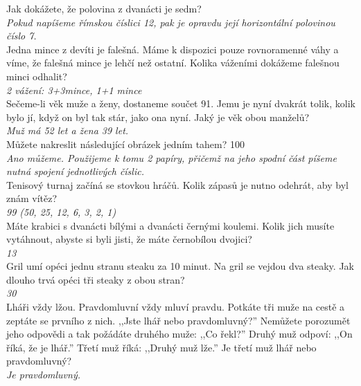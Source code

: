\begin{multicols}{2}
\noindent
Jak dokážete, že polovina z dvanácti je sedm?\\[1 mm]
{\sl Pokud napíšeme římskou číslici 12, pak je opravdu její horizontální 
polovinou číslo 7.}\\

\noindent
Jedna mince z devíti je falešná. Máme k dispozici pouze rovnoramenné 
váhy a víme, že falešná mince je lehčí než ostatní. Kolika váženími 
dokážeme falešnou minci odhalit?\\[1 mm]
{\sl 2 vážení: 3+3mince, 1+1 mince}\\

\noindent
Sečeme-li věk muže a ženy, dostaneme součet 91. Jemu je nyní 
dvakrát tolik, kolik bylo jí, když on byl tak stár, jako ona 
nyní. Jaký je věk obou manželů?\\[1 mm]
{\sl Muž má 52 let a žena 39 let.}\\

\noindent
Můžete nakreslit následující obrázek jedním tahem? 100\\[1 mm]
{\sl Ano můžeme. Použijeme k tomu 2 papíry, přičemž na jeho spodní 
část píšeme nutná spojení jednotlivých číslic.}\\

\noindent
Tenisový turnaj začíná se stovkou hráčů. Kolik zápasů je 
nutno odehrát, aby byl znám vítěz?\\[1 mm]
{\sl 99 (50, 25, 12, 6, 3, 2, 1)}\\

\noindent
Máte krabici s dvanácti bílými a dvanácti černými koulemi. 
Kolik jich musíte vytáhnout, abyste si byli jisti, že máte černobílou 
dvojici?\\[1 mm]
{\sl 13}\\

\noindent
Gril umí opéci jednu stranu steaku za 10 minut. Na gril se 
vejdou dva steaky. Jak dlouho trvá opéci tři steaky z obou
stran?\\[1 mm]
{\sl 30}\\

\noindent
Lháři vždy lžou. Pravdomluvní vždy mluví pravdu. Potkáte 
tři muže na cestě a zeptáte se prvního z nich. ,,Jste lhář nebo 
pravdomluvný?'' Nemůžete porozumět jeho odpovědi a tak požádáte 
druhého muže: ,,Co řekl?'' Druhý muž odpoví: ,,On říká, že je 
lhář.'' Třetí muž říká: ,,Druhý muž lže.'' Je třetí muž lhář 
nebo pravdomluvný?\\[1 mm]
{\sl Je pravdomluvný.}\\


\end{multicols}
